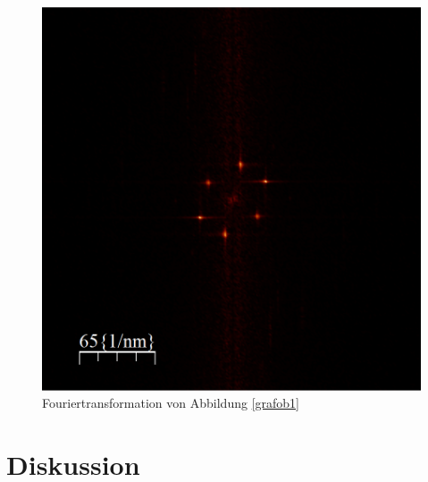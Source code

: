 \documentclass[10pt,a4paper]{article}
\begin{document}
\begin{figure}[h]
	\centering
	
	\includegraphics[scale = 0.5]{Fouriertrasformation_kristall.png}
	
	\caption{Fouriertransformation von Abbildung \ref{grafob1}}
	\label{fouriertansformation_ebene}
\end{figure}

\section{ Diskussion}
\end{document}

